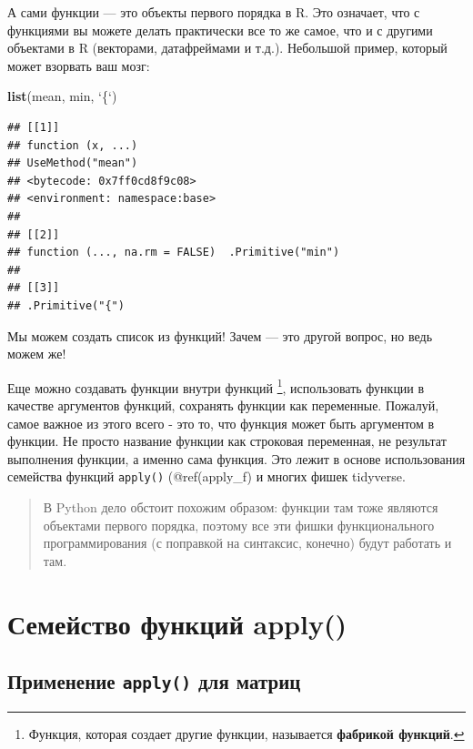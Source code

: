 \documentclass[]{book}
\newenvironment{Shaded}{\begin{snugshade}}{\end{snugshade}}
\newcommand{\KeywordTok}[1]{\textcolor[rgb]{0.13,0.29,0.53}{\textbf{#1}}}
\newcommand{\DataTypeTok}[1]{\textcolor[rgb]{0.13,0.29,0.53}{#1}}
\newcommand{\StringTok}[1]{\textcolor[rgb]{0.31,0.60,0.02}{#1}}
\newcommand{\NormalTok}[1]{#1}
\begin{document}
А сами функции --- это объекты первого порядка в R. Это означает, что с
функциями вы можете делать практически все то же самое, что и с другими
объектами в R (векторами, датафреймами и т.д.). Небольшой пример,
который может взорвать ваш мозг:

\begin{Shaded}
\begin{Highlighting}[]
\KeywordTok{list}\NormalTok{(mean, min, }\StringTok{`}\DataTypeTok{\{}\StringTok{`}\NormalTok{)}
\end{Highlighting}
\end{Shaded}

\begin{verbatim}
## [[1]]
## function (x, ...) 
## UseMethod("mean")
## <bytecode: 0x7ff0cd8f9c08>
## <environment: namespace:base>
## 
## [[2]]
## function (..., na.rm = FALSE)  .Primitive("min")
## 
## [[3]]
## .Primitive("{")
\end{verbatim}

Мы можем создать список из функций! Зачем --- это другой вопрос, но ведь
можем же!

Еще можно создавать функции внутри функций \footnote{Функция, которая
  создает другие функции, называется \textbf{фабрикой функций}.},
использовать функции в качестве аргументов функций, сохранять функции
как переменные. Пожалуй, самое важное из этого всего - это то, что
функция может быть аргументом в функции. Не просто название функции как
строковая переменная, не результат выполнения функции, а именно сама
функция. Это лежит в основе использования семейства функций
\texttt{apply()} (@ref(apply\_f) и многих фишек tidyverse.

\begin{quote}
В Python дело обстоит похожим образом: функции там тоже являются
объектами первого порядка, поэтому все эти фишки функционального
программирования (с поправкой на синтаксис, конечно) будут работать и
там.
\end{quote}

\section{Семейство функций apply()}\label{apply_f}

\subsection{\texorpdfstring{Применение \texttt{apply()} для
матриц}{Применение apply() для матриц}}\label{apply}
\end{document}
